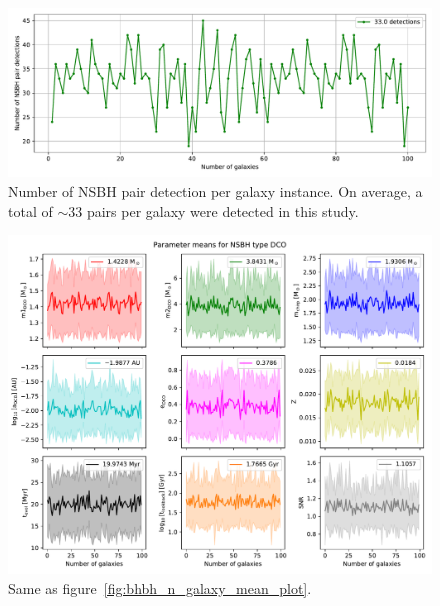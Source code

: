 \begin{figure}[!h]
	\centering
	\includegraphics[width=\columnwidth]{analysis_data/004__images_for_latex/NSBH_n_detections}
	\caption{Number of NSBH pair detection per galaxy instance. On average, a total of $\sim$33 pairs per galaxy were detected in this study.}
	\label{fig:nsbhndetections}
\end{figure}	

\begin{figure}[!h]
	\centering
	\includegraphics[width=\columnwidth]{analysis_data/004__images_for_latex/NSBH_n_galaxy_mean_plot}
	\caption{Same as figure~\ref{fig:bhbh_n_galaxy_mean_plot}.}
	\label{fig:nsbh_n_galaxy_mean_plot}
\end{figure}

